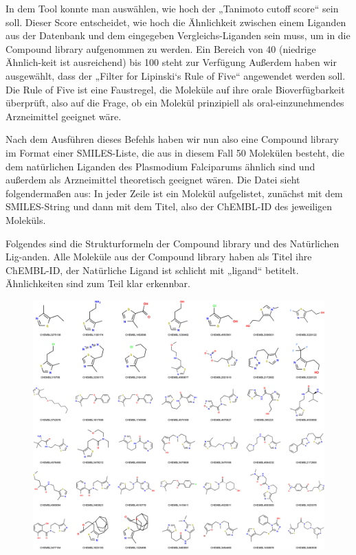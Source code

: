 \documentclass[11pt]{article}
\begin{document}
    In dem Tool konnte man auswählen, wie hoch der „Tanimoto cutoff score“ sein soll. Dieser Score entscheidet, wie hoch die Ähnlichkeit zwischen einem Liganden aus der Datenbank und dem eingegeben Vergleichs-Liganden sein muss, um in die Compound library aufgenommen zu werden. Ein Bereich von 40 (niedrige Ähnlich-keit ist ausreichend) bis 100 steht zur Verfügung Außerdem haben wir ausgewählt, dass der „Filter for Lipinski‘s Rule of Five“ angewendet werden soll. Die Rule of Five ist eine Faustregel, die Moleküle auf ihre orale Bioverfügbarkeit überprüft, also auf die Frage, ob ein Molekül prinzipiell als oral-einzunehmendes Arzneimittel geeignet wäre.


    Nach dem Ausführen dieses Befehls haben wir nun also eine Compound library im Format einer SMILES-Liste, die aus in diesem Fall 50 Molekülen besteht, die dem natürlichen Liganden des Plasmodium Falciparums ähnlich sind und außerdem als Arzneimittel theoretisch geeignet wären. Die Datei sieht folgendermaßen aus: In jeder Zeile ist ein Molekül aufgelistet, zunächst mit dem SMILES-String und dann mit dem Titel, also der ChEMBL-ID des jeweiligen Moleküls.

    Folgendes sind die Strukturformeln der Compound library und des Natürlichen Lig-anden. Alle Moleküle aus der Compound library haben als Titel ihre ChEMBL-ID, der Natürliche Ligand ist schlicht mit „ligand“ betitelt. Ähnlichkeiten sind zum Teil klar erkennbar.

    \begin{figure}
        \includegraphics[width=\textwidth]{P. Falciparum - ligands - visual}\label{fig:figure}
    \end{figure}
\end{document}

